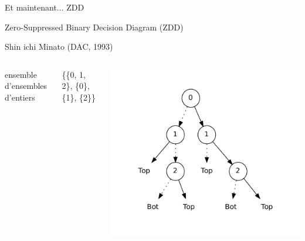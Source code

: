 \documentclass{beamer}
\begin{document}

\begin{frame}{}
  \begin{center}
			Et maintenant... ZDD
  \end{center}
\end{frame}




\begin{frame}{Zero-Suppressed Binary Decision Diagram (ZDD)}

  Shin ichi Minato (DAC, 1993)


  \begin{columns}
    ensemble d'ensembles d'entiers

    \bigskip\bigskip
    \bigskip\bigskip
    \{\{0, 1, 2\}, \{0\}, \{1\}, \{2\}\}

    \hspace*{-1em}\includegraphics[scale=0.5]{imports/zdd_ex.pdf}
  \end{columns}
\end{frame}
\end{document}
